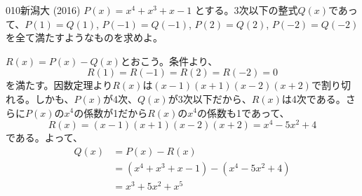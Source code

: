 \begin{thm}{010}{}{新潟大 (2016)}
 $P(x)=x^4+x^3+x-1$ とする。3次以下の整式$Q(x)$であって、$P(1)=Q(1)$, $P(-1)=Q(-1)$, $P(2)=Q(2)$, $P(-2)=Q(-2)$ を全て満たすようなものを求めよ。
\end{thm}

$R(x)=P(x)-Q(x)$とおこう。条件より、
\[ R(1)=R(-1)=R(2)=R(-2)=0 \]
を満たす。因数定理より$R(x)$は$(x-1)(x+1)(x-2)(x+2)$で割り切れる。しかも、$P(x)$が4次、$Q(x)$が3次以下だから、$R(x)$は4次である。さらに$P(x)$の$x^4$の係数が1だから$R(x)$の$x^4$の係数も1であって、
\[ R(x)=(x-1)(x+1)(x-2)(x+2)=x^4-5x^2+4 \]
である。よって、
\begin{align*}
 Q(x)&=P(x)-R(x) \\
&=(x^4+x^3+x-1)-(x^4-5x^2+4) \\
&= x^3+5x^2+x^5
\end{align*}
